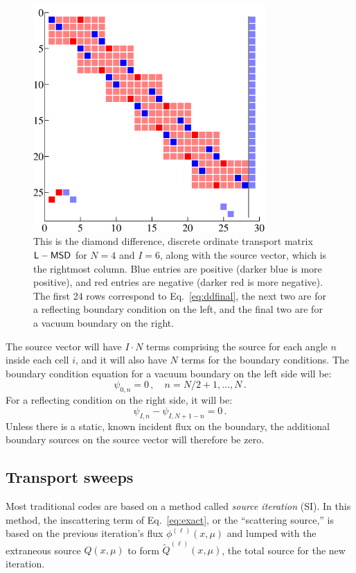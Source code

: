 \documentclass[]{SRJcommon}
\begin{document}
\begin{figure}[htb]
  \centering
  \includegraphics[width=3.5in]{matrix}
  \caption{This is the diamond difference, discrete ordinate transport matrix
  $\mathsf{L} - \mathsf{M} \mathsf{S} \mathsf{D}$
  for $N=4$ and $I=6$, along with the source vector, which is the rightmost
  column. Blue entries are positive (darker blue is more
  positive), and red entries are negative (darker red is more negative). The
  first 24 rows correspond to Eq.~\eqref{eq:ddfinal}, the next two are for a
  reflecting boundary condition on the left, and the final two are for a vacuum
  boundary on the right.}
  \label{fig:transportmatrix}
\end{figure}

The source vector will have $I\cdot N$ terms comprising the source for
each angle $n$ inside each cell $i$, and it will also have $N$ terms for the
boundary conditions.
The boundary condition equation for a vacuum boundary on the left side will be:
$$ \psi_{0,n} = 0 \,, \quad n= N/2 + 1, \ldots, N \,.$$
For a reflecting condition on the right side, it will be:
$$ \psi_{I,n} - \psi_{I,N+1-n} = 0 \,.$$
Unless there is a static, known incident flux on the boundary, the additional
boundary sources on the source vector will therefore be zero.
\subsection{Transport sweeps}
Most traditional codes are based on a method called \emph{source iteration}
(SI). In this method, the inscattering term of Eq.~\eqref{eq:exact},
or the ``scattering source,'' is based on the previous
iteration's flux $\phi^{(\ell)}(x,\mu)$ and lumped with the
extraneous source $Q(x,\mu)$ to form $\tilde{Q}^{(\ell)}(x,\mu)$, the total
source for the new iteration.
\end{document}
